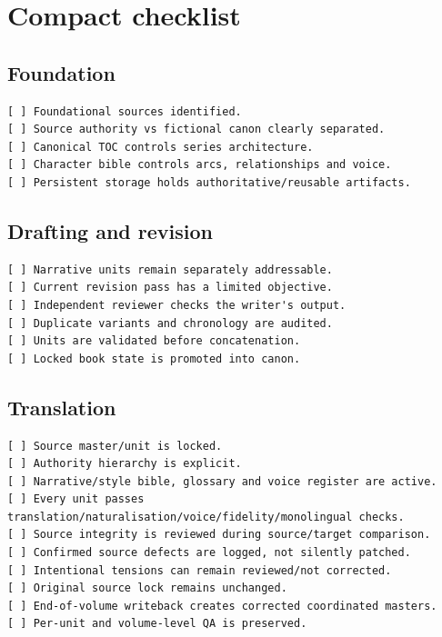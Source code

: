 \documentclass[11pt,oneside,openany]{book}
\begin{document}
\chapter{Compact checklist}\label{compact-checklist}

\section{Foundation}\label{foundation}

\begin{lstlisting}
[ ] Foundational sources identified.
[ ] Source authority vs fictional canon clearly separated.
[ ] Canonical TOC controls series architecture.
[ ] Character bible controls arcs, relationships and voice.
[ ] Persistent storage holds authoritative/reusable artifacts.
\end{lstlisting}

\section{Drafting and revision}\label{drafting-and-revision}

\begin{lstlisting}
[ ] Narrative units remain separately addressable.
[ ] Current revision pass has a limited objective.
[ ] Independent reviewer checks the writer's output.
[ ] Duplicate variants and chronology are audited.
[ ] Units are validated before concatenation.
[ ] Locked book state is promoted into canon.
\end{lstlisting}

\section{Translation}\label{translation}

\begin{lstlisting}
[ ] Source master/unit is locked.
[ ] Authority hierarchy is explicit.
[ ] Narrative/style bible, glossary and voice register are active.
[ ] Every unit passes translation/naturalisation/voice/fidelity/monolingual checks.
[ ] Source integrity is reviewed during source/target comparison.
[ ] Confirmed source defects are logged, not silently patched.
[ ] Intentional tensions can remain reviewed/not corrected.
[ ] Original source lock remains unchanged.
[ ] End-of-volume writeback creates corrected coordinated masters.
[ ] Per-unit and volume-level QA is preserved.
\end{lstlisting}
\end{document}
